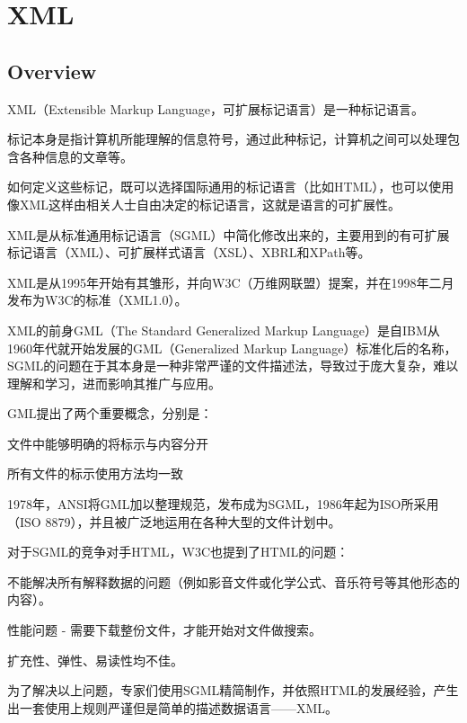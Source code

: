 \part{XML}


\chapter{Overview}


XML（Extensible Markup Language，可扩展标记语言）是一种标记语言。

标记本身是指计算机所能理解的信息符号，通过此种标记，计算机之间可以处理包含各种信息的文章等。

如何定义这些标记，既可以选择国际通用的标记语言（比如HTML），也可以使用像XML这样由相关人士自由决定的标记语言，这就是语言的可扩展性。

XML是从标准通用标记语言（SGML）中简化修改出来的，主要用到的有可扩展标记语言（XML）、可扩展样式语言（XSL）、XBRL和XPath等。

XML是从1995年开始有其雏形，并向W3C（万维网联盟）提案，并在1998年二月发布为W3C的标准（XML1.0）。

XML的前身GML（The Standard Generalized Markup Language）是自IBM从1960年代就开始发展的GML（Generalized Markup Language）标准化后的名称，SGML的问题在于其本身是一种非常严谨的文件描述法，导致过于庞大复杂，难以理解和学习，进而影响其推广与应用。

GML提出了两个重要概念，分别是：

\begin{compactitem}
\item 文件中能够明确的将标示与内容分开
\item 所有文件的标示使用方法均一致
\end{compactitem}

1978年，ANSI将GML加以整理规范，发布成为SGML，1986年起为ISO所采用（ISO 8879），并且被广泛地运用在各种大型的文件计划中。

对于SGML的竞争对手HTML，W3C也提到了HTML的问题：

\begin{compactitem}
\item 不能解决所有解释数据的问题（例如影音文件或化学公式、音乐符号等其他形态的内容）。
\item 性能问题 - 需要下载整份文件，才能开始对文件做搜索。
\item 扩充性、弹性、易读性均不佳。
\end{compactitem}

为了解决以上问题，专家们使用SGML精简制作，并依照HTML的发展经验，产生出一套使用上规则严谨但是简单的描述数据语言——XML。


